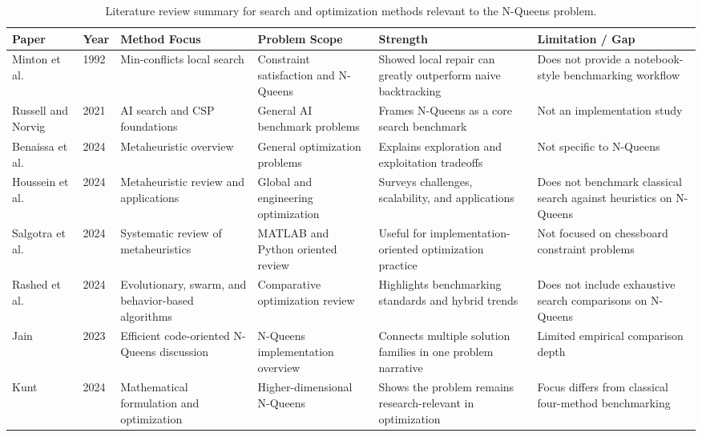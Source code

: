\documentclass[conference]{IEEEtran}
\begin{document}
\begin{table}[!ht]
\centering
\caption{Literature review summary for search and optimization methods relevant to the N-Queens problem.}
\label{tab:LiteratureSummary}
\begin{tabular}{|p{2.9cm}|p{0.9cm}|p{2.0cm}|p{2.4cm}|p{2.4cm}|p{3.6cm}|}
\hline
\textbf{Paper} & \textbf{Year} & \textbf{Method Focus} & \textbf{Problem Scope} & \textbf{Strength} & \textbf{Limitation / Gap} \\ \hline
Minton et al.~\cite{minton1992minconflicts} & 1992 & Min-conflicts local search & Constraint satisfaction and N-Queens & Showed local repair can greatly outperform naive backtracking & Does not provide a notebook-style benchmarking workflow \\ \hline
Russell and Norvig~\cite{russell2021aima} & 2021 & AI search and CSP foundations & General AI benchmark problems & Frames N-Queens as a core search benchmark & Not an implementation study \\ \hline
Benaissa et al.~\cite{benaissa2024metaheuristic} & 2024 & Metaheuristic overview & General optimization problems & Explains exploration and exploitation tradeoffs & Not specific to N-Queens \\ \hline
Houssein et al.~\cite{houssein2024metaheuristics} & 2024 & Metaheuristic review and applications & Global and engineering optimization & Surveys challenges, scalability, and applications & Does not benchmark classical search against heuristics on N-Queens \\ \hline
Salgotra et al.~\cite{salgotra2024systematic} & 2024 & Systematic review of metaheuristics & MATLAB and Python oriented review & Useful for implementation-oriented optimization practice & Not focused on chessboard constraint problems \\ \hline
Rashed et al.~\cite{rashed2024advancements} & 2024 & Evolutionary, swarm, and behavior-based algorithms & Comparative optimization review & Highlights benchmarking standards and hybrid trends & Does not include exhaustive search comparisons on N-Queens \\ \hline
Jain~\cite{jain2023efficient} & 2023 & Efficient code-oriented N-Queens discussion & N-Queens implementation overview & Connects multiple solution families in one problem narrative & Limited empirical comparison depth \\ \hline
Kunt~\cite{kunt2024higher} & 2024 & Mathematical formulation and optimization & Higher-dimensional N-Queens & Shows the problem remains research-relevant in optimization & Focus differs from classical four-method benchmarking \\ \hline

\end{tabular}
\end{table}
\end{document}
